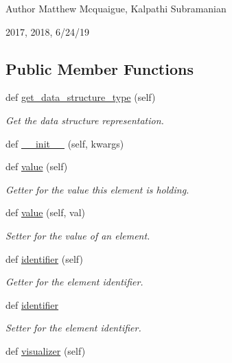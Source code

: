 \begin{DoxyAuthor}{Author}
Matthew Mcquaigue, Kalpathi Subramanian
\end{DoxyAuthor}
2017, 2018, 6/24/19 \subsection*{Public Member Functions}
\begin{DoxyCompactItemize}
\item 
def \mbox{\hyperlink{classbridges_1_1element_1_1_element_a87b8c79123d20eb2af48ae4e4f1bcf32}{get\+\_\+data\+\_\+structure\+\_\+type}} (self)
\begin{DoxyCompactList}\small\item\em Get the data structure representation. \end{DoxyCompactList}\item 
def \mbox{\hyperlink{classbridges_1_1element_1_1_element_ac0291307e216e5f2da60a340a1e2142d}{\+\_\+\+\_\+init\+\_\+\+\_\+}} (self, kwargs)
\item 
def \mbox{\hyperlink{classbridges_1_1element_1_1_element_ab89d51b751ad0956d7ec855c35335ad2}{value}} (self)
\begin{DoxyCompactList}\small\item\em Getter for the value this element is holding. \end{DoxyCompactList}\item 
def \mbox{\hyperlink{classbridges_1_1element_1_1_element_a810c122a8b900f476601d565291bdbf8}{value}} (self, val)
\begin{DoxyCompactList}\small\item\em Setter for the value of an element. \end{DoxyCompactList}\item 
def \mbox{\hyperlink{classbridges_1_1element_1_1_element_a8eb98e53169fc83f6adde36e1896cf2f}{identifier}} (self)
\begin{DoxyCompactList}\small\item\em Getter for the element identifier. \end{DoxyCompactList}\item 
def \mbox{\hyperlink{classbridges_1_1element_1_1_element_a70ac403466ed78146974a22cebfa0c19}{identifier}}
\begin{DoxyCompactList}\small\item\em Setter for the element identifier. \end{DoxyCompactList}\item 
def \mbox{\hyperlink{classbridges_1_1element_1_1_element_a727ec3cb97aeb68fec4cb456535f6763}{visualizer}} (self)

\end{DoxyCompactItemize}

